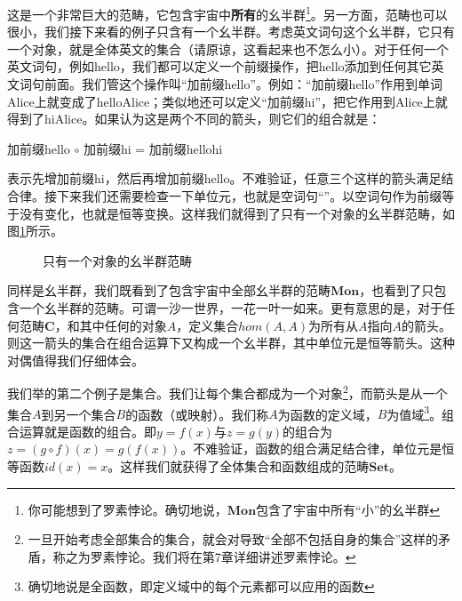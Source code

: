 \documentclass{article}
\begin{document}
这是一个非常巨大的范畴，它包含宇宙中\textbf{所有}的幺半群\footnote{你可能想到了罗素悖论。确切地说，$\pmb{Mon}$包含了宇宙中所有“小”的幺半群}。另一方面，范畴也可以很小，我们接下来看的例子只含有一个幺半群。考虑英文词句这个幺半群，它只有一个对象，就是全体英文的集合（请原谅，这看起来也不怎么小）。对于任何一个英文词句，例如hello，我们都可以定义一个前缀操作，把hello添加到任何其它英文词句前面。我们管这个操作叫“加前缀hello”。例如：“加前缀hello”作用到单词Alice上就变成了helloAlice；类似地还可以定义“加前缀hi”，把它作用到Alice上就得到了hiAlice。如果认为这是两个不同的箭头，则它们的组合就是：

\begin{center}
加前缀hello $\circ$ 加前缀hi = 加前缀hellohi
\end{center}

表示先增加前缀hi，然后再增加前缀hello。不难验证，任意三个这样的箭头满足结合律。接下来我们还需要检查一下单位元，也就是空词句“”。以空词句作为前缀等于没有变化，也就是恒等变换。这样我们就得到了只有一个对象的幺半群范畴，如图\ref{fig:monoid-as-category}所示。

\begin{figure}[htbp]
\centering
{}
\caption{只有一个对象的幺半群范畴}
\label{fig:monoid-as-category}
\end{figure}

同样是幺半群，我们既看到了包含宇宙中全部幺半群的范畴$\pmb{Mon}$，也看到了只包含一个幺半群的范畴。可谓一沙一世界，一花一叶一如来。更有意思的是，对于任何范畴$\pmb{C}$，和其中任何的对象$A$，定义集合$hom(A, A)$为所有从$A$指向$A$的箭头。则这一箭头的集合在组合运算下又构成一个幺半群，其中单位元是恒等箭头。这种对偶值得我们仔细体会。

我们举的第二个例子是集合。我们让每个集合都成为一个对象\footnote{一旦开始考虑全部集合的集合，就会对导致“全部不包括自身的集合”这样的矛盾，称之为罗素悖论。我们将在第7章详细讲述罗素悖论。}，而箭头是从一个集合$A$到另一个集合$B$的函数（或映射）。我们称$A$为函数的定义域，$B$为值域\footnote{确切地说是全函数，即定义域中的每个元素都可以应用的函数}。组合运算就是函数的组合。即$y = f(x)$与$z = g(y)$的组合为$z = (g \circ f)(x) = g(f(x))$。不难验证，函数的组合满足结合律，单位元是恒等函数$id(x) = x$。这样我们就获得了全体集合和函数组成的范畴$\pmb{Set}$。
\end{document}
